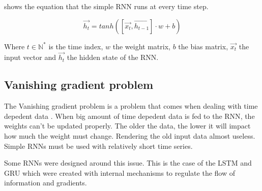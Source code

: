  shows the equation that the simple \ac{RNN} runs at every time step.

\begin{equation}\label{eq:srnn}
  \overrightarrow{h_t}=tanh([\overrightarrow{x_t},\overrightarrow{h_{t-1}}]\cdot w + b)
\end{equation}

Where $t\in\mathbb{N}^*$ is the time index, $w$ the weight matrix, $b$ the bias matrix, $\overrightarrow{x_t}$ the input vector and $\overrightarrow{h_{t}}$ the hidden state of the \ac{RNN}.

\subsection{Vanishing gradient problem}

The Vanishing gradient problem is a problem that comes when dealing with time depedent data \cite{vanishGrad}. When big amount of time depedent data is fed to the \ac{RNN}, the weights can't be updated properly. The older the data, the lower it will impact how much the weight must change. Rendering the old input data almost useless. Simple \acp{RNN} must be used with relatively short time series.

Some \acp{RNN} were designed around this issue. This is the case of the \ac{LSTM} and \ac{GRU} which were created with internal mechanisms to regulate the flow of information and gradients.
